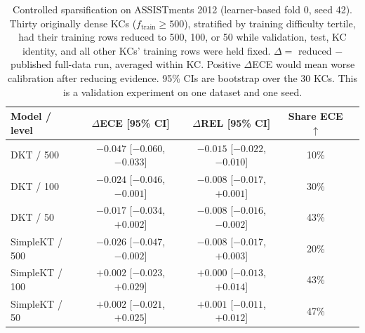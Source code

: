 \begin{table}[htbp]
\caption{Controlled sparsification on ASSISTments 2012 (learner-based fold 0, seed 42). Thirty originally dense KCs ($f_{\mathrm{train}}\ge 500$), stratified by training difficulty tertile, had their training rows reduced to 500, 100, or 50 while validation, test, KC identity, and all other KCs' training rows were held fixed. $\Delta = $ reduced $-$ published full-data run, averaged within KC. Positive $\Delta$ECE would mean worse calibration after reducing evidence. 95\% CIs are bootstrap over the 30 KCs. This is a validation experiment on one dataset and one seed.}
\label{tab:a9_sparsification}
\centering
\small
\begin{tabular}{lcccc}
\toprule
Model / level & $\Delta$ECE [95\% CI] & $\Delta$REL [95\% CI] & Share ECE$\uparrow$ \\
\midrule
DKT / 500 & $-0.047$ [$-0.060$, $-0.033$] & $-0.015$ [$-0.022$, $-0.010$] & 10\% \\
DKT / 100 & $-0.024$ [$-0.046$, $-0.001$] & $-0.008$ [$-0.017$, $+0.001$] & 30\% \\
DKT / 50 & $-0.017$ [$-0.034$, $+0.002$] & $-0.008$ [$-0.016$, $-0.002$] & 43\% \\
SimpleKT / 500 & $-0.026$ [$-0.047$, $-0.002$] & $-0.008$ [$-0.017$, $+0.003$] & 20\% \\
SimpleKT / 100 & $+0.002$ [$-0.023$, $+0.029$] & $+0.000$ [$-0.013$, $+0.014$] & 43\% \\
SimpleKT / 50 & $+0.002$ [$-0.021$, $+0.025$] & $+0.001$ [$-0.011$, $+0.012$] & 47\% \\
\bottomrule
\end{tabular}
\end{table}
